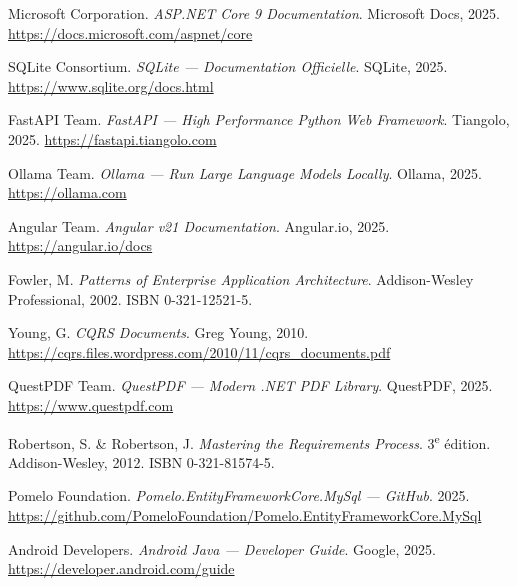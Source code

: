 \begin{enumerate}[label={[\arabic*]},leftmargin=1.8em]

  \item Microsoft Corporation.
    \textit{ASP.NET Core 9 Documentation}.
    Microsoft Docs, 2025.
    \url{https://docs.microsoft.com/aspnet/core}

  \item SQLite Consortium.
    \textit{SQLite — Documentation Officielle}.
    SQLite, 2025.
    \url{https://www.sqlite.org/docs.html}

  \item FastAPI Team.
    \textit{FastAPI — High Performance Python Web Framework}.
    Tiangolo, 2025.
    \url{https://fastapi.tiangolo.com}

  \item Ollama Team.
    \textit{Ollama — Run Large Language Models Locally}.
    Ollama, 2025.
    \url{https://ollama.com}

  \item Angular Team.
    \textit{Angular v21 Documentation}.
    Angular.io, 2025.
    \url{https://angular.io/docs}

  \item Fowler, M.
    \textit{Patterns of Enterprise Application Architecture}.
    Addison-Wesley Professional, 2002.
    ISBN 0-321-12521-5.

  \item Young, G.
    \textit{CQRS Documents}.
    Greg Young, 2010.
    \url{https://cqrs.files.wordpress.com/2010/11/cqrs_documents.pdf}

  \item QuestPDF Team.
    \textit{QuestPDF — Modern .NET PDF Library}.
    QuestPDF, 2025.
    \url{https://www.questpdf.com}

  \item Robertson, S. \& Robertson, J.
    \textit{Mastering the Requirements Process}. 3\textsuperscript{e} édition.
    Addison-Wesley, 2012.
    ISBN 0-321-81574-5.

  \item Pomelo Foundation.
    \textit{Pomelo.EntityFrameworkCore.MySql — GitHub}.
    2025.
    \url{https://github.com/PomeloFoundation/Pomelo.EntityFrameworkCore.MySql}

  \item Android Developers.
    \textit{Android Java — Developer Guide}.
    Google, 2025.
    \url{https://developer.android.com/guide}

\end{enumerate}
